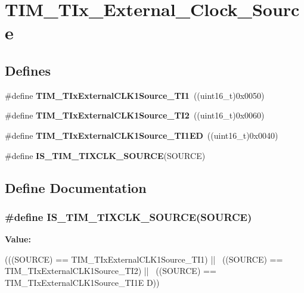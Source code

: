 \hypertarget{group__TIM__TIx__External__Clock__Source}{
\section{TIM\_\-TIx\_\-External\_\-Clock\_\-Source}
\label{group__TIM__TIx__External__Clock__Source}
}
\subsection*{Defines}
\begin{DoxyCompactItemize}
\item 
\hypertarget{group__TIM__TIx__External__Clock__Source_ga237daecde6e1f75509acc80a9ccce820}{
\#define {\bfseries TIM\_\-TIxExternalCLK1Source\_\-TI1}~((uint16\_\-t)0x0050)}
\label{group__TIM__TIx__External__Clock__Source_ga237daecde6e1f75509acc80a9ccce820}

\item 
\hypertarget{group__TIM__TIx__External__Clock__Source_gafa3c6345a7e1c3668b2e7e4d61a79491}{
\#define {\bfseries TIM\_\-TIxExternalCLK1Source\_\-TI2}~((uint16\_\-t)0x0060)}
\label{group__TIM__TIx__External__Clock__Source_gafa3c6345a7e1c3668b2e7e4d61a79491}

\item 
\hypertarget{group__TIM__TIx__External__Clock__Source_gaa1a749bc38d434902b69a45d50ee0889}{
\#define {\bfseries TIM\_\-TIxExternalCLK1Source\_\-TI1ED}~((uint16\_\-t)0x0040)}
\label{group__TIM__TIx__External__Clock__Source_gaa1a749bc38d434902b69a45d50ee0889}

\item 
\#define {\bfseries IS\_\-TIM\_\-TIXCLK\_\-SOURCE}(SOURCE)
\end{DoxyCompactItemize}


\subsection{Define Documentation}
\hypertarget{group__TIM__TIx__External__Clock__Source_gabfa9cd6cf6e9df4bff8d6cdf16c6b374}{
\subsubsection[{IS\_\-TIM\_\-TIXCLK\_\-SOURCE}]{\setlength{\rightskip}{0pt plus 5cm}\#define IS\_\-TIM\_\-TIXCLK\_\-SOURCE(SOURCE)}}
\label{group__TIM__TIx__External__Clock__Source_gabfa9cd6cf6e9df4bff8d6cdf16c6b374}
{\bfseries Value:}
\begin{DoxyCode}
(((SOURCE) == TIM_TIxExternalCLK1Source_TI1) || \
                                      ((SOURCE) == TIM_TIxExternalCLK1Source_TI2)
       || \
                                      ((SOURCE) == TIM_TIxExternalCLK1Source_TI1E
      D))
\end{DoxyCode}
